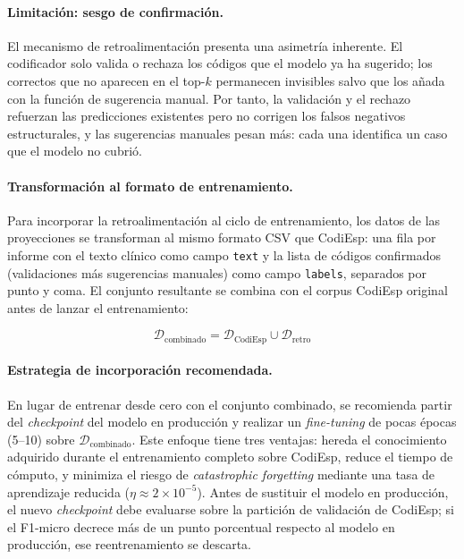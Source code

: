 \paragraph{Limitación: sesgo de confirmación.}
El mecanismo de retroalimentación presenta una asimetría inherente. El codificador solo valida o rechaza los códigos que el modelo ya ha sugerido; los correctos que no aparecen en el top-$k$ permanecen invisibles salvo que los añada con la función de sugerencia manual. Por tanto, la validación y el rechazo refuerzan las predicciones existentes pero no corrigen los falsos negativos estructurales, y las sugerencias manuales pesan más: cada una identifica un caso que el modelo no cubrió.

\paragraph{Transformación al formato de entrenamiento.}
Para incorporar la retroalimentación al ciclo de entrenamiento, los datos de las proyecciones se
transforman al mismo formato CSV que CodiEsp: una fila por informe con el texto clínico
como campo \texttt{text} y la lista de códigos confirmados (validaciones más sugerencias
manuales) como campo \texttt{labels}, separados por punto y coma. El conjunto resultante
se combina con el corpus CodiEsp original antes de lanzar el entrenamiento:

\begin{equation*}
 \mathcal{D}_{\text{combinado}} = \mathcal{D}_{\text{CodiEsp}} \cup \mathcal{D}_{\text{retro}}
\end{equation*}

\paragraph{Estrategia de incorporación recomendada.}
En lugar de entrenar desde cero con el conjunto combinado, se recomienda partir del
\emph{checkpoint} del modelo en producción y realizar un \emph{fine-tuning} de pocas
épocas (5--10) sobre $\mathcal{D}_{\text{combinado}}$. Este enfoque tiene tres ventajas:
hereda el conocimiento adquirido durante el entrenamiento completo sobre CodiEsp, reduce
el tiempo de cómputo, y minimiza el riesgo de \emph{catastrophic forgetting} mediante una
tasa de aprendizaje reducida ($\eta \approx 2 \times 10^{-5}$). Antes de sustituir el
modelo en producción, el nuevo \emph{checkpoint} debe evaluarse sobre la partición de
validación de CodiEsp; si el F1-micro decrece más de un punto porcentual respecto al
modelo en producción, ese reentrenamiento se descarta.

